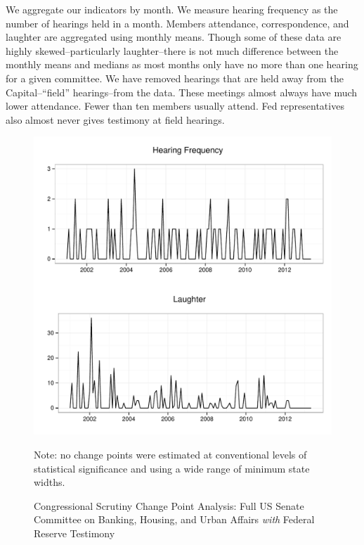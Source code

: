 \documentclass[a4paper]{article}\usepackage[]{graphicx}\usepackage[]{color}
\newenvironment{knitrout}{}{} %
\begin{document}
We aggregate our indicators by month. We measure hearing frequency as the number of hearings held in a month. Members attendance, correspondence, and laughter are aggregated using monthly means. Though some of these data are highly skewed--particularly laughter--there is not much difference between the monthly means and medians as most months only have no more than one hearing for a given committee. We have removed hearings that are held away from the Capital--``field'' hearings--from the data. These meetings almost always have much lower attendance. Fewer than ten members usually attend. Fed representatives also almost never gives testimony at field hearings.

\begin{figure}
    \caption{Congressional Scrutiny Change Point Analysis: Full US Senate Committee on Banking, Housing, and Urban Affairs \emph{with} Federal Reserve Testimony}
    \label{fig:SenateFedCP}
\begin{knitrout}
\color{fgcolor}

{\centering \includegraphics[width=0.8\linewidth]{figure/ScrutinySenate} 

}



\end{knitrout}
{\scriptsize{Note: no change points were estimated at conventional levels of statistical significance and using a wide range of minimum state widths.}}
\end{figure}
\end{document}

